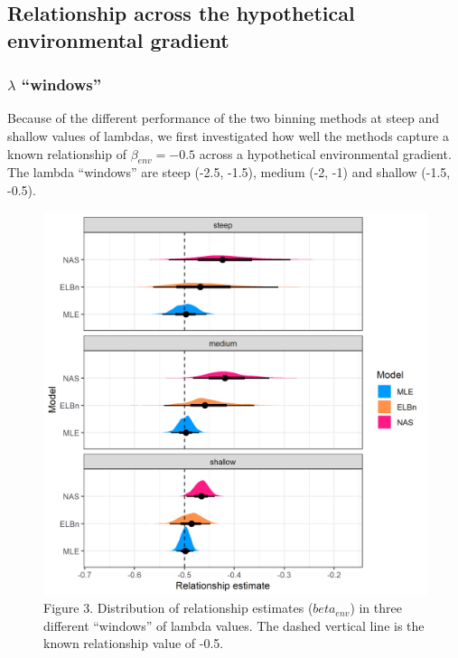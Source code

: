 \documentclass[
]{article}
\begin{document}
\hypertarget{relationship-across-the-hypothetical-environmental-gradient}{%
\subsection{Relationship across the hypothetical environmental
gradient}\label{relationship-across-the-hypothetical-environmental-gradient}}

\hypertarget{lambda-windows}{%
\subsubsection{\texorpdfstring{\(\lambda\)
``windows''}{\textbackslash lambda ``windows''}}\label{lambda-windows}}

Because of the different performance of the two binning methods at steep
and shallow values of lambdas, we first investigated how well the
methods capture a known relationship of \(\beta_{env} = -0.5\) across a
hypothetical environmental gradient. The lambda ``windows'' are steep
(-2.5, -1.5), medium (-2, -1) and shallow (-1.5, -0.5).

\begin{figure}
\centering
\includegraphics{figures/lambda_angle_plot.png}
\caption{Figure 3. Distribution of relationship estimates
(\(beta_{env}\)) in three different ``windows'' of lambda values. The
dashed vertical line is the known relationship value of -0.5.}
\end{figure}
\end{document}
